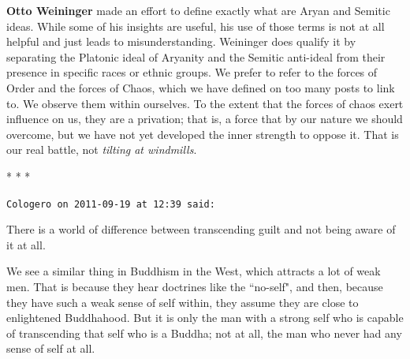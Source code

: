 \textbf{Otto Weininger} made an effort to define exactly what are Aryan and Semitic ideas. While some of his insights are useful, his use of those terms is not at all helpful and just leads to misunderstanding. Weininger does qualify it by separating the Platonic ideal of Aryanity and the Semitic anti-ideal from their presence in specific races or ethnic groups. We prefer to refer to the forces of Order and the forces of Chaos, which we have defined on too many posts to link to. We observe them within ourselves. To the extent that the forces of chaos exert influence on us, they are a privation; that is, a force that by our nature we should overcome, but we have not yet developed the inner strength to oppose it. That is our real battle, not \emph{tilting at windmills}.




\begin{center}* * *\end{center}

\begin{footnotesize}\begin{sffamily}



\texttt{Cologero on 2011-09-19 at 12:39 said: }

There is a world of difference between transcending guilt and not being aware of it at all.

We see a similar thing in Buddhism in the West, which attracts a lot of weak men. That is because they hear doctrines like the ``no-self", and then, because they have such a weak sense of self within, they assume they are close to enlightened Buddhahood. But it is only the man with a strong self who is capable of transcending that self who is a Buddha; not at all, the man who never had any sense of self at all.


\hfill


\end{sffamily}\end{footnotesize}
